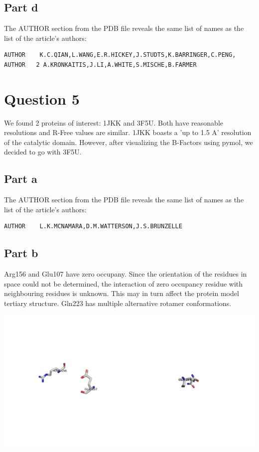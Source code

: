 \documentclass[11pt, a4paper,titlepage]{article}
\begin{document}
\subsection*{Part d}

The AUTHOR section from the PDB file reveals the same list of names as
the list of the article's authors:

\begin{verbatim}
AUTHOR    K.C.QIAN,L.WANG,E.R.HICKEY,J.STUDTS,K.BARRINGER,C.PENG,               
AUTHOR   2 A.KRONKAITIS,J.LI,A.WHITE,S.MISCHE,B.FARMER         
\end{verbatim}
 
\section*{Question 5}
We found 2 proteins of interest: 1JKK and 3F5U. Both have reasonable
resolutions and R-Free values are similar. 1JKK boasts a 'up to 1.5 A'
resolution of the catalytic domain. However, after visualizing the
B-Factors using pymol, we decided to go with 3F5U.

\subsection*{Part a}

The AUTHOR section from the PDB file reveals the same list of names as
the list of the article's authors:

\begin{verbatim}
AUTHOR    L.K.MCNAMARA,D.M.WATTERSON,J.S.BRUNZELLE
\end{verbatim}

\subsection*{Part b}

Arg156 and Glu107 have zero occupany. Since the orientation of the
residues in space could not be determined, the interaction of zero
occupancy residue with neighbouring residues is unknown. This may in
turn affect the protein model tertiary structure.  Gln223 has multiple
alternative rotamer conformations.

\includegraphics[width=15cm]{./Figures/5b.png}
\end{document}
